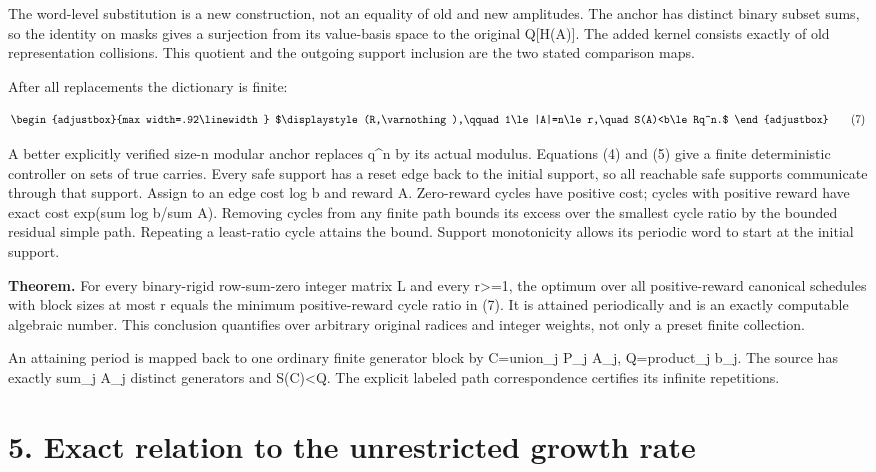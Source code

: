 The word-level substitution is a new construction, not an equality of old and new amplitudes. The anchor has distinct binary subset sums, so the identity on masks gives a surjection from its value-basis space to the original Q{[}H(A){]}. The added kernel consists exactly of old representation collisions. This quotient and the outgoing support inclusion are the two stated comparison maps.

After all replacements the dictionary is finite:

\[
\begin{adjustbox}{max width=.92\linewidth}
$\displaystyle (R,\varnothing),\qquad
1\le |A|=n\le r,\quad S(A)<b\le Rq^n.$
\end{adjustbox}
\tag{7}
\]

A better explicitly verified size-n modular anchor replaces q\^{}n by its actual modulus. Equations (4) and (5) give a finite deterministic controller on sets of true carries. Every safe support has a reset edge back to the initial support, so all reachable safe supports communicate through that support. Assign to an edge cost log b and reward \textbar A\textbar. Zero-reward cycles have positive cost; cycles with positive reward have exact cost exp(sum log b/sum \textbar A\textbar). Removing cycles from any finite path bounds its excess over the smallest cycle ratio by the bounded residual simple path. Repeating a least-ratio cycle attains the bound. Support monotonicity allows its periodic word to start at the initial support.

\textbf{Theorem.} For every binary-rigid row-sum-zero integer matrix L and every r\textgreater=1, the optimum over all positive-reward canonical schedules with block sizes at most r equals the minimum positive-reward cycle ratio in (7). It is attained periodically and is an exactly computable algebraic number. This conclusion quantifies over arbitrary original radices and integer weights, not only a preset finite collection.

An attaining period is mapped back to one ordinary finite generator block by C=union\_j P\_j A\_j, Q=product\_j b\_j. The source has exactly sum\_j \textbar A\_j\textbar{} distinct generators and S(C)\textless Q. The explicit labeled path correspondence certifies its infinite repetitions.

\section{5. Exact relation to the unrestricted growth rate}\label{n06-exact-relation-to-the-unrestricted-growth-rate}


